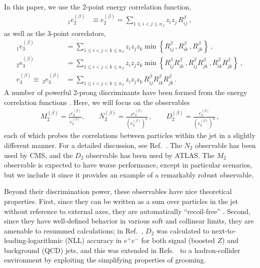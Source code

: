 \documentclass[11pt]{cernrep}
\begin{document}
In this paper, we use the 2-point energy correlation function,
\begin{align}\label{jetsub_2prong_eq:explicit_twopointvar}
_1e_2^{(\beta)}&\equiv e_2^{(\beta)}=\sum_{1\leq i<j\leq n_J} z_{i}z_{j} \, R_{ij}^\beta\ ,
\end{align}
as well as the 3-point correlators,
\begin{align}\label{jetsub_2prong_eq:explicit_ecfvar}
_1e_{3}^{(\beta)}&=\sum_{1\leq i<j<k\leq n_J} z_{i}z_{j}z_{k} \min \left\{ R_{ij}^\beta\,,  R_{ik}^\beta\,, R_{jk}^\beta  \right\} \ , \nonumber \\
_2e_{3}^{(\beta)}&=\sum_{1\leq i<j<k\leq n_J} z_{i}z_{j}z_{k} \min \left\{R_{ij}^\beta R_{ik}^\beta\,, R_{ij}^\beta  R_{jk}^\beta\,,     R_{ik}^\beta R_{jk}^\beta    \right\}  \ , \nonumber \\
e_{3}^{(\beta)}\equiv ~_3e_{3}^{(\beta)}&=\sum_{1\leq i<j<k\leq n_J} z_{i}z_{j}z_{k} \, R_{ij}^\beta R_{ik}^\beta R_{jk}^\beta \,.
\end{align}
%
A number of powerful 2-prong discriminants have been formed from the energy correlation functions  \cite{Larkoski:2013eya,Larkoski:2014gra,Larkoski:2014zma,Moult:2016cvt}.  Here, we will focus on the observables
\begin{align}
 M_2^{(\beta)} = \frac{_1e_{3}^{(\beta)}}{e_{2}^{(\beta)}}, \qquad  N_2^{(\beta)} = \frac{_2e_{3}^{(\beta)}}{(e_{2}^{(\beta)})^2}\,, \qquad  D_{2}^{(\beta)}=\frac{e_{3}^{(\beta)}}{(e_{2}^{(\beta)})^{3}}\,, 
\end{align}
each of which probes the correlations between particles within the jet in a slightly different manner.
%
For a detailed discussion, see Ref.~\cite{Moult:2016cvt}.
%
The $N_2$ observable has been used by CMS, and the $D_2$ observable has been used by ATLAS.
%
The $M_2$ observable is expected to have worse performance, except in particular scenarios, but we include it since it provides an example of a remarkably robust observable.

Beyond their discrimination power, these observables have nice theoretical properties.
%
First, since they can be written as a sum over particles in the jet without reference to external axes, they are automatically ``recoil-free'' \cite{Catani:1992jc,Dokshitzer:1998kz,Banfi:2004yd,Larkoski:2013eya,Larkoski:2014uqa}.
%
Second, since they have well-defined behavior in various soft and collinear limits, they are amenable to resummed calculations;  in Ref.~\cite{Larkoski:2015kga}, $D_2$ was calculated to next-to-leading-logarithmic (NLL) accuracy in $e^+e^-$ for both signal (boosted $Z$) and background (QCD) jets, and this was extended in Refs.~\cite{Larkoski:2017iuy,Larkoski:2017cqq} to a hadron-collider environment by exploiting the simplifying properties of grooming.
\end{document}
